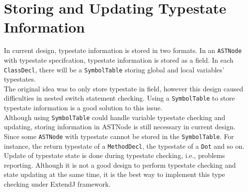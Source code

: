 \documentclass[]{article}
\begin{document}
\section{Storing and Updating Typestate Information}
In current design, typestate information is stored in two formats. In an \texttt{ASTNode} with typestate specifcation, typestate information is stored as a field. In each \texttt{ClassDecl}, there will be a \texttt{SymbolTable} storing global and local variables' typestates.\\[0.2cm]
The original idea was to only store typestate in field, however this design caused difficulties in nested switch statement checking. Using a \texttt{SymbolTable} to store typestate information is a good solution to this issue.\\[0.2cm]
Although using \texttt{SymbolTable} could handle variable typestate checking and updating, storing information in ASTNode is still necessary in current design. Since some \texttt{ASTNode} with typestate cannot be stored in the \texttt{SymbolTable}. For instance, the return typestate of a \texttt{MethodDecl}, the typestate of a \texttt{Dot} and so on. \\[0.2cm]
Update of typestate state is done during typestate checking, i.e., problems reporting. Although it is not a good design to perform typestate checking and state updating at the same time, it is the best way to implement this type checking under ExtendJ framework.


%
\end{document}
